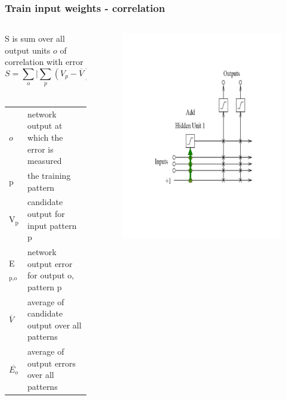 \documentclass[presentation]{beamer}
\begin{document}
\begin{frame}
  \frametitle{Train input weights - correlation}
	\begin{columns}[t]
		\begin{column}[t]{0.5\textwidth}
      \small{S is sum over all output units $\mathit{o}$ of correlation with error}
      $$ S = \sum_{o} \lvert \sum_{p} (V_{p} - \overline{V}) (E_{p,o} - \overline{E_{o}}) \rvert $$
     \\  
      \begin{center}
        \begin{tabular}{ll}
          \(\mathit{o}\) & \tiny{network output at which the error is measured} \\
          p & \tiny{the training pattern} \\
          V\(_{\text{p}}\) & \tiny{candidate output for input pattern p}   \\
          E\(_{\text{p,o}}\) & \tiny{network output error for output o, pattern p} \\
          \(\overline{V}\) & \tiny{average of candidate output over all patterns} \\
          \(\overline{E_{o}}\) & \tiny{average of output errors over all patterns} \\
        \end{tabular}
      \end{center}
		\end{column}
		\begin{column}{0.5\textwidth}
      \begin{figure}
        \centering
        \includegraphics[scale=0.28]{trainInputunit.png}

\end{figure}
\end{column}
\end{columns}
\end{frame}
\end{document}
